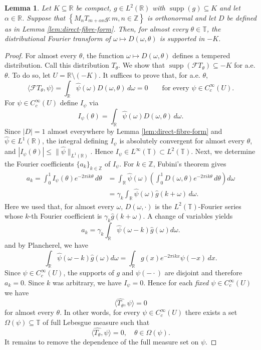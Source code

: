 \documentclass[reqno,a4paper,12pt]{amsart}
\numberwithin{equation}{section}
\newtheorem{lemma}[definition]{Lemma}
\def\Z{{\mathbb Z}}
\def\R{{\mathbb R}}
\def\T{{\mathbb T}}
\newcommand{\ft}{{\mathcal{F}}}
\newcommand{\supp}{\operatorname{supp}}
\newcommand\1{\mathds{1}}
\begin{document}
\begin{lemma}\label{lem:fibre-compact-spectrum}
Let $K\subseteq \R$ be compact, $g \in L^2(\R)$ with $\supp (g) \subseteq K$ and let $\alpha \in \R$. Suppose that $\left\{M_nT_{m+\alpha n}g : m,n \in \Z \right\}$ is orthonormal and let $D$ be defined as in Lemma \ref{lem:direct-fibre-form}. Then, for almost every $\theta \in \T$, the distributional Fourier transform of $\omega\mapsto D(\omega,\theta)$ is supported in $-K$.
\end{lemma}

\begin{proof}
For almost every $\theta$, the function $\omega\mapsto D(\omega,\theta)$ defines a tempered distribution. Call this distribution $T_\theta$.
We show that $\operatorname{supp}(\ft T_\theta)\subseteq -K$
for a.e. $\theta$. To do so, let
$
U=\mathbb R\setminus(-K).
$
It suffices to prove that, for a.e. $\theta$,
$$
\langle \ft T_\theta ,\psi\rangle = \int_{\mathbb R}\widehat\psi(\omega)D(\omega,\theta)\,d\omega =0
\qquad
\text{for every } \psi\in C_c^\infty(U).
$$
For $\psi \in C_c^\infty(U)$ define $I_\psi$ via
$$
I_\psi(\theta)
=
\int_{\mathbb R}\widehat\psi(\omega)D(\omega,\theta)\,d\omega.
$$
Since $|D|=1$ almost everywhere by Lemma \ref{lem:direct-fibre-form}
and $\widehat{\psi}\in L^1(\mathbb R)$, the integral defining $I_\psi$
is absolutely convergent for almost every $\theta$, and
$
|I_\psi(\theta)|
\leq
\|\widehat\psi\|_{L^1(\mathbb R)} .
$
Hence $I_\psi\in L^\infty(\mathbb T)\subset L^2(\mathbb T)$. Next, we determine the Fourier coefficients $\{ a_k \}_{k \in \Z}$ of $I_\psi$.
For $k\in\mathbb Z$, Fubini's theorem gives
\begin{equation}
\begin{aligned}
a_k = \int_0^1 I_\psi(\theta)e^{-2\pi i k\theta}\,d\theta
&=
\int_{\mathbb R}\widehat\psi(\omega)
\left(
\int_0^1 D(\omega,\theta)e^{-2\pi i k\theta}\,d\theta
\right)
d\omega  \\
&=
\gamma_k
\int_{\mathbb R}\widehat\psi(\omega)\widehat g(k+\omega)\,d\omega .
\end{aligned}
\end{equation}
Here we used that, for almost every $\omega$, $D(\omega,\cdot)$ is the
$L^2(\mathbb T)$-Fourier series whose $k$-th Fourier coefficient is
$\gamma_k\widehat g(k+\omega)$.
A change of variables yields
$$
a_k = \gamma_k \int_\R \widehat\psi(\omega-k) \widehat g(\omega) d \omega.
$$
and by Plancherel, we have
$$
\int_\R \widehat\psi(\omega-k) \widehat g(\omega) d \omega =
\int_\R g(x) e^{-2\pi i k x} \psi(-x) \, dx.
$$
Since $\psi \in C_c^\infty(U)$, the supports of $g$ and $\psi(-\cdot)$ are disjoint and therefore $a_k=0$. Since $k$ was arbitrary, we have $I_\psi = 0$. Hence for each \emph{fixed} $\psi \in C_c^\infty(U)$ we have
$$
\langle \widehat{T_\theta}, \psi \rangle = 0
$$
for almost every $\theta$. In other words, for every $\psi \in C_c^\infty(U)$ there exists a set $\Omega(\psi) \subseteq \T$ of full Lebesgue measure such that
$$
\langle \widehat{T_\theta}, \psi \rangle = 0, \quad \theta \in \Omega(\psi).
$$
It remains to remove the dependence of the full measure set on $\psi$.


\end{proof}
\end{document}
